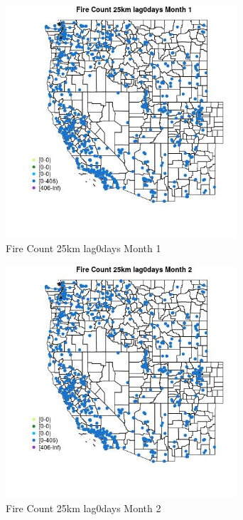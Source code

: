 \begin{figure} 
\centering  
\includegraphics[width=0.77\textwidth]{Code_Outputs/Report_ML_input_PM25_Step4_part_f_de_duplicated_aveswNAs_MapObsMo1Fire_Count_25km_lag0days.jpg} 
\caption{\label{fig:Report_ML_input_PM25_Step4_part_f_de_duplicated_aveswNAsMapObsMo1Fire_Count_25km_lag0days}Fire Count 25km lag0days Month 1} 
\end{figure} 
 

\begin{figure} 
\centering  
\includegraphics[width=0.77\textwidth]{Code_Outputs/Report_ML_input_PM25_Step4_part_f_de_duplicated_aveswNAs_MapObsMo2Fire_Count_25km_lag0days.jpg} 
\caption{\label{fig:Report_ML_input_PM25_Step4_part_f_de_duplicated_aveswNAsMapObsMo2Fire_Count_25km_lag0days}Fire Count 25km lag0days Month 2} 
\end{figure} 
 

